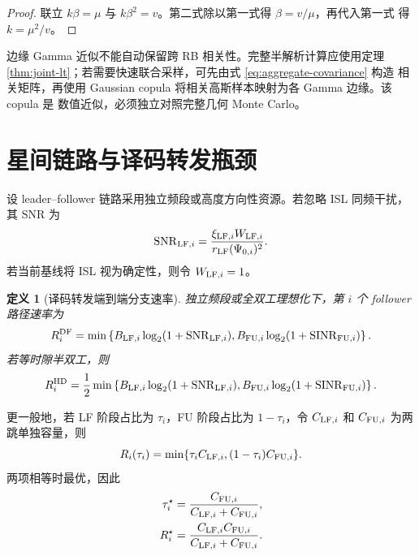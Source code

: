 \documentclass[UTF8,a4paper,11pt]{ctexart}
\newtheorem{definition}{定义}[section]
\newcommand{\SINR}{\operatorname{SINR}}
\newcommand{\SNR}{\operatorname{SNR}}
\begin{document}
\begin{proof}
联立 $k\beta=\mu$ 与 $k\beta^2=v$。第二式除以第一式得 $\beta=v/\mu$，再代入第一式
得 $k=\mu^2/v$。
\end{proof}

边缘 Gamma 近似不能自动保留跨 RB 相关性。完整半解析计算应使用定理
\ref{thm:joint-lt}；若需要快速联合采样，可先由式 \eqref{eq:aggregate-covariance} 构造
相关矩阵，再使用 Gaussian copula 将相关高斯样本映射为各 Gamma 边缘。该 copula 是
数值近似，必须独立对照完整几何 Monte Carlo。

\section{星间链路与译码转发瓶颈}

设 leader--follower 链路采用独立频段或高度方向性资源。若忽略 ISL 同频干扰，其 SNR
为
\begin{equation}
 \SNR_{{\rm LF},i}
 =
 \frac{\xi_{{\rm LF},i}W_{{\rm LF},i}}
 {r_{\rm LF}(\Psi_{0,i})^2}.
 \label{eq:lf-snr}
\end{equation}
若当前基线将 ISL 视为确定性，则令 $W_{{\rm LF},i}=1$。

\begin{definition}[译码转发端到端分支速率]
独立频段或全双工理想化下，第 $i$ 个 follower 路径速率为
\begin{equation}
 R_i^{\rm DF}
 =
 \min\left\{
 B_{{\rm LF},i}\log_2(1+\SNR_{{\rm LF},i}),
 B_{{\rm FU},i}\log_2(1+\SINR_{{\rm FU},i})
 \right\}.
 \label{eq:df-rate}
\end{equation}
若等时隙半双工，则
\begin{equation}
 R_i^{\rm HD}
 =
 \frac12\min\left\{
 B_{{\rm LF},i}\log_2(1+\SNR_{{\rm LF},i}),
 B_{{\rm FU},i}\log_2(1+\SINR_{{\rm FU},i})
 \right\}.
 \label{eq:half-duplex-rate}
\end{equation}
\end{definition}

更一般地，若 LF 阶段占比为 $\tau_i$，FU 阶段占比为 $1-\tau_i$，令
$C_{{\rm LF},i}$ 和 $C_{{\rm FU},i}$ 为两跳单独容量，则
\begin{equation}
 R_i(\tau_i)=\min\{\tau_iC_{{\rm LF},i},(1-\tau_i)C_{{\rm FU},i}\}.
 \label{eq:time-split-rate}
\end{equation}
两项相等时最优，因此
\begin{align}
 \tau_i^\star
 &=\frac{C_{{\rm FU},i}}{C_{{\rm LF},i}+C_{{\rm FU},i}},
 \label{eq:time-split-opt}\\
 R_i^\star
 &=\frac{C_{{\rm LF},i}C_{{\rm FU},i}}
 {C_{{\rm LF},i}+C_{{\rm FU},i}}.
 \label{eq:harmonic-rate}
\end{align}
\end{document}
